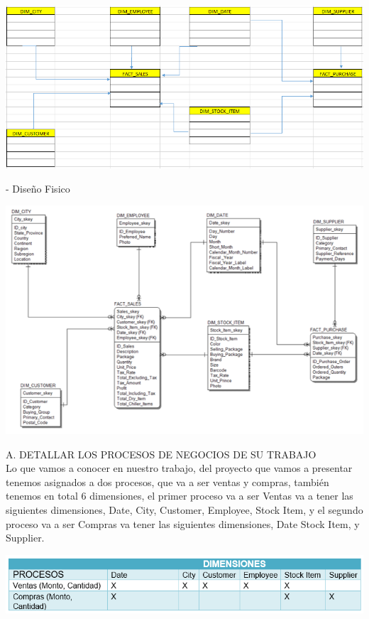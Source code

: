 \documentclass[12pt,letterpaper]{article}
\begin{document}
\begin{center}
\includegraphics[width=17cm]{IMG/7.png} 
\end{center}

- Dise\~no Fisico

\begin{center}
\includegraphics[width=17cm]{IMG/8.png} 
\end{center}

A.	DETALLAR LOS PROCESOS DE NEGOCIOS DE SU TRABAJO\\

Lo que vamos a conocer en nuestro trabajo, del proyecto que vamos a presentar tenemos asignados a dos procesos, que va a ser ventas y compras, tambi\'en tenemos en total 6 dimensiones, el primer proceso va a ser Ventas va a tener las siguientes dimensiones, Date, City, Customer, Employee, Stock Item, y el segundo proceso va a ser Compras va tener las siguientes dimensiones, Date Stock Item, y Supplier.

\begin{center}
\includegraphics[width=17cm]{IMG/9.png} 
\end{center}
\end{document}
